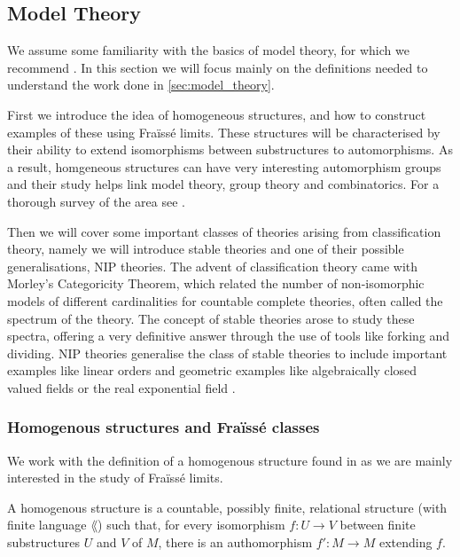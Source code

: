 \newpage

\subsection{Model Theory}%
\label{sub:model_theory}

We assume some familiarity with the basics of model theory, for which we recommend \cite{marker02}.
In this section we will focus mainly on the definitions needed to understand the work done in
\cref{sec:model_theory}.

First we introduce the idea of homogeneous structures, and how to construct examples of these
using Fraïssé limits. These structures will be characterised by their ability to extend isomorphisms
between substructures to automorphisms. As a result, homgeneous structures can have very interesting
automorphism groups and their study helps link model theory, group theory and combinatorics. For a
thorough survey of the area see \cite{macpherson11}.

Then we will cover some important classes of theories arising from classification theory, namely we
will introduce stable theories and one of their possible generalisations, NIP theories. The advent
of classification theory came with Morley's Categoricity Theorem, which related the number of
non-isomorphic models of different cardinalities for countable complete theories, often called the
spectrum of the theory. The concept of stable theories arose to study these spectra, offering a very
definitive answer through the use of tools like forking and dividing. NIP theories generalise the
class of stable theories to include important examples like linear orders and geometric examples
like algebraically closed valued fields \cite{acvf-NIP} or the real exponential field
\cite{steinhorn1999}.

\subsubsection{Homogenous structures and Fraïssé classes}%
\label{ssub:homogeneous_structures_and_fraisse_classes}

We work with the definition of a homogenous structure found in \cite{macpherson11} as we are
mainly interested in the study of Fraïssé limits.

\begin{defn}
  A homogenous structure is a countable, possibly finite, relational structure (with finite
  language $\lang$) such that, for every isomorphism $f : U \to V$ between finite substructures $U$
  and $V$ of $M$, there is an authomorphism $f' : M \to M$ extending $f$.
\end{defn}

